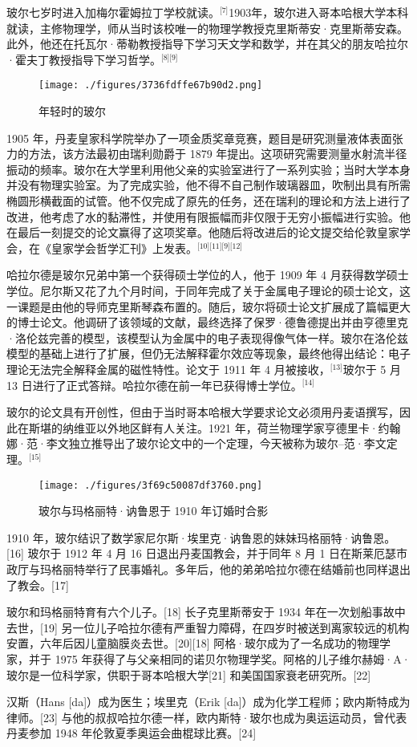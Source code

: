 玻尔七岁时进入加梅尔霍姆拉丁学校就读。\(^\text{[7]}\)1903年，玻尔进入哥本哈根大学本科就读，主修物理学，师从当时该校唯一的物理学教授克里斯蒂安·克里斯蒂安森。此外，他还在托瓦尔·蒂勒教授指导下学习天文学和数学，并在其父的朋友哈拉尔·霍夫丁教授指导下学习哲学。\(^\text{[8][9]}\)
\begin{figure}[ht]
\centering
\texttt{[image: ./figures/3736fdffe67b90d2.png]}
\caption{年轻时的玻尔} \label{fig_NRSbr_1}
\end{figure}
1905 年，丹麦皇家科学院举办了一项金质奖章竞赛，题目是研究测量液体表面张力的方法，该方法最初由瑞利勋爵于 1879 年提出。这项研究需要测量水射流半径振动的频率。玻尔在大学里利用他父亲的实验室进行了一系列实验；当时大学本身并没有物理实验室。为了完成实验，他不得不自己制作玻璃器皿，吹制出具有所需椭圆形横截面的试管。他不仅完成了原先的任务，还在瑞利的理论和方法上进行了改进，他考虑了水的黏滞性，并使用有限振幅而非仅限于无穷小振幅进行实验。他在最后一刻提交的论文赢得了这项奖章。他随后将改进后的论文提交给伦敦皇家学会，在《皇家学会哲学汇刊》上发表。\(^\text{[10][11][9][12]}\)

哈拉尔德是玻尔兄弟中第一个获得硕士学位的人，他于 1909 年 4 月获得数学硕士学位。尼尔斯又花了九个月时间，于同年完成了关于金属电子理论的硕士论文，这一课题是由他的导师克里斯琴森布置的。随后，玻尔将硕士论文扩展成了篇幅更大的博士论文。他调研了该领域的文献，最终选择了保罗·德鲁德提出并由亨德里克·洛伦兹完善的模型，该模型认为金属中的电子表现得像气体一样。玻尔在洛伦兹模型的基础上进行了扩展，但仍无法解释霍尔效应等现象，最终他得出结论：电子理论无法完全解释金属的磁性特性。论文于 1911 年 4 月被接收，\(^\text{[13]}\)玻尔于 5 月 13 日进行了正式答辩。哈拉尔德在前一年已获得博士学位。\(^\text{[14]}\)

玻尔的论文具有开创性，但由于当时哥本哈根大学要求论文必须用丹麦语撰写，因此在斯堪的纳维亚以外地区鲜有人关注。1921 年，荷兰物理学家亨德里卡·约翰娜·范·李文独立推导出了玻尔论文中的一个定理，今天被称为玻尔–范·李文定理。\(^\text{[15]}\)
\begin{figure}[ht]
\centering
\texttt{[image: ./figures/3f69c50087df3760.png]}
\caption{玻尔与玛格丽特·讷鲁恩于 1910 年订婚时合影} \label{fig_NRSbr_2}
\end{figure}
1910 年，玻尔结识了数学家尼尔斯·埃里克·讷鲁恩的妹妹玛格丽特·讷鲁恩。[16] 玻尔于 1912 年 4 月 16 日退出丹麦国教会，并于同年 8 月 1 日在斯莱厄瑟市政厅与玛格丽特举行了民事婚礼。多年后，他的弟弟哈拉尔德在结婚前也同样退出了教会。[17]

玻尔和玛格丽特育有六个儿子。[18] 长子克里斯蒂安于 1934 年在一次划船事故中去世，[19] 另一位儿子哈拉尔德有严重智力障碍，在四岁时被送到离家较远的机构安置，六年后因儿童脑膜炎去世。[20][18] 阿格·玻尔成为了一名成功的物理学家，并于 1975 年获得了与父亲相同的诺贝尔物理学奖。阿格的儿子维尔赫姆·A·玻尔是一位科学家，供职于哥本哈根大学[21] 和美国国家衰老研究所。[22]

汉斯（Hans [da]）成为医生；埃里克（Erik [da]）成为化学工程师；欧内斯特成为律师。[23] 与他的叔叔哈拉尔德一样，欧内斯特·玻尔也成为奥运运动员，曾代表丹麦参加 1948 年伦敦夏季奥运会曲棍球比赛。[24]
